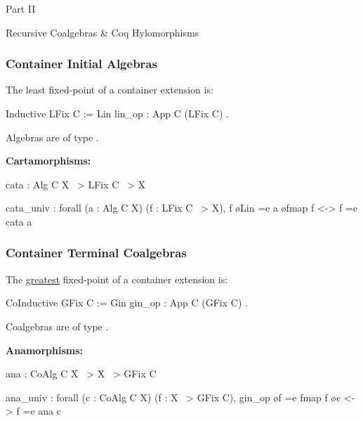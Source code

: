 \begin{frame}
  \vfill
  \centering
  \begin{sticky}
    {\normalfont Part II}

    {\normalfont\Large Recursive Coalgebras \& Coq Hylomorphisms}
    \par%
  \end{sticky}
  \vfill
\end{frame}

\begin{frame}[fragile]
  \frametitle{Container Initial Algebras}

  The least fixed-point of a container extension  is:
  \begin{coqcode}
    Inductive LFix C := Lin { lin_op : App C (LFix C) }.
  \end{coqcode}
  \vspace{.4cm}

  Algebras are of type .
  \vspace{.4cm}

  \textbf{Cartamorphisms:}
  \begin{coqcode}
cata : Alg C X ~> LFix C ~> X

cata_univ : forall (a : Alg C X) (f : LFix C ~> X),
  f \o Lin =e a \o fmap f <-> f =e cata a
  \end{coqcode}
\end{frame}

\begin{frame}[fragile]
  \frametitle{Container Terminal Coalgebras}

  The \ul{greatest} fixed-point of a container extension  is:
  \begin{coqcode}
    CoInductive GFix C := Gin { gin_op : App C (GFix C) }.
  \end{coqcode}
  \vspace{.4cm}

  Coalgebras are of type .
  \vspace{.4cm}

  \textbf{Anamorphisms:}
  \begin{coqcode}
ana : CoAlg C X ~> X ~> GFix C

ana_univ : forall (c : CoAlg C X) (f : X ~> GFix C),
  gin_op \o f =e fmap f \o c <-> f =e ana c
  \end{coqcode}
\end{frame}

